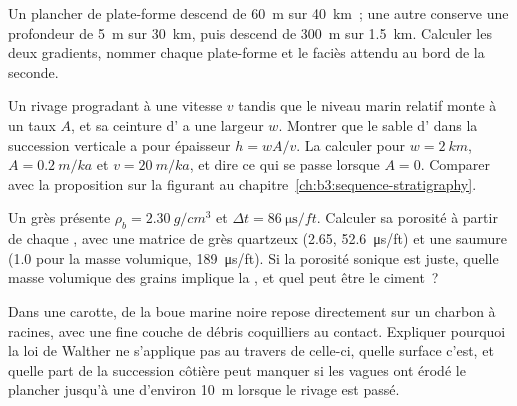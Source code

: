 \begin{exercise}[$\star\star$]\label{exo:b3:facies-models:9}
Un plancher de plate-forme descend de \qty{60}{m} sur \qty{40}{km}~; une autre conserve
une profondeur de \qty{5}{m} sur \qty{30}{km}, puis descend de \qty{300}{m} sur
\qty{1.5}{km}. Calculer les deux gradients, nommer chaque plate-forme et le faciès
attendu au bord de la seconde.
\end{exercise}

\begin{exercise}[$\star\star\star$]\label{exo:b3:facies-models:10}
Un rivage progradant à une vitesse $v$ tandis que le niveau marin relatif monte à un taux
$A$, et sa ceinture d' a une largeur $w$. Montrer que le sable d' dans la
succession verticale a pour épaisseur $h = wA/v$. La calculer pour $w = \qty{2}{km}$,
$A = \qty{0.2}{m/ka}$ et $v = \qty{20}{m/ka}$, et dire ce qui se passe lorsque
$A = 0$. Comparer avec la proposition sur la 
figurant au chapitre~\ref{ch:b3:sequence-stratigraphy}.
\end{exercise}

\begin{exercise}[$\star\star\star$]\label{exo:b3:facies-models:11}
Un grès présente $\rho_b = \qty{2.30}{g/cm^3}$ et $\Delta t =
\qty{86}{\micro\second/ft}$. Calculer sa porosité à partir de chaque , avec une
matrice de grès quartzeux (2.65, \qty{52.6}{\micro\second/ft}) et une saumure (1.0 pour la
masse volumique, \qty{189}{\micro\second/ft}). Si la porosité sonique est juste, quelle
masse volumique des grains implique la , et quel peut être le ciment~?
\end{exercise}

\begin{exercise}[$\star\star\star$]\label{exo:b3:facies-models:12}
Dans une carotte, de la boue marine noire repose directement sur un charbon à racines, avec une
fine couche de débris coquilliers au contact. Expliquer pourquoi la loi de Walther ne
s'applique pas au travers de celle-ci, quelle surface c'est, et quelle part de la
succession côtière peut manquer si les vagues ont érodé le plancher jusqu'à une
 d'environ \qty{10}{m} lorsque le rivage est passé.
\end{exercise}

